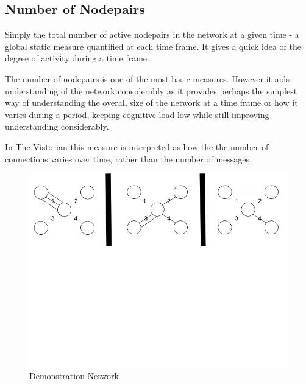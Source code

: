 \subsection{Number of Nodepairs}
Simply the total number of active nodepairs in the network at a given time - a global static measure quantified at each time frame. It gives a quick idea of the degree of activity during a time frame.

The number of nodepairs is one of the most basic measures. However it aids understanding of the network considerably as it provides perhaps the simplest way of understanding the overall size of the network at a time frame or how it varies during a period, keeping cognitive load low while still improving understanding considerably.

In The Vistorian this measure is interpreted as how the the number of connections varies over time, rather than the number of messages.


\begin{figure}[h!]
  \begin{center}
  \includegraphics[trim={0 11cm 0 0}, clip, width=140mm]{./Figures/globalMeasuresReferenceNetwork.png}
  \end{center}
  \caption{Demonstration Network}
  \label{fig:demonstrationNetwork}
\end{figure}


